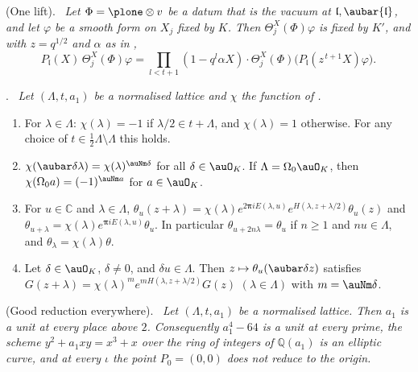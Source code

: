 \documentclass[10pt]{amsart}
\theoremstyle{definition}
\theoremstyle{remark}
\newcommand{\C}{\mathbb C}
\newcommand{\Q}{\mathbb Q}
\newenvironment{quotedthm}[2]{\par\medskip\noindent\begingroup
  \textbf{#1}#2.\ \itshape\ignorespaces}{\endgroup\par\medskip}
\begin{document}
\begin{quotedthm}{\cite[Proposition~6.9]{P49}}{ (One lift)}
Let $\Phi=\plone\otimes v$ be a datum that is the vacuum at $\mathfrak l,\aubar{\mathfrak l}$, and
let $\varphi$ be a smooth form on $X_j$ fixed by $K$. Then $\Theta^X_j(\Phi)\varphi$ is fixed by
$K'$, and with $z=q^{1/2}$ and $\alpha$ as in {\cite[Lemma~6.8]{P49}},
\[
P_{\mathfrak l}(X)\,\Theta^X_j(\Phi)\varphi=\prod_{l<t+1}(1-q^l\alpha X)\cdot\Theta^X_j(\Phi)\bigl(
P_{\mathfrak l}(z^{\,t+1}X)\varphi\bigr).
\]
\end{quotedthm}

\begin{quotedthm}{\cite[Lemma~7.1]{P49}}{}
Let $(\Lambda,t,a_1)$ be a normalised lattice and $\chi$ the function of {\cite[(27)]{P49}}.
\begin{enumerate}
\item[(a)] For $\lambda\in\Lambda$: $\chi(\lambda)=-1$ if $\lambda/2\in t+\Lambda$, and
$\chi(\lambda)=1$ otherwise. For any choice of $t\in\frac12\Lambda\setminus\Lambda$ this holds.
\item[(b)] $\chi(\aubar\delta\lambda)=\chi(\lambda)^{\auNm\delta}$ for all $\delta\in\auO_K$. If
$\Lambda=\Omega_0\auO_K$, then $\chi(\Omega_0a)=(-1)^{\auNm a}$ for $a\in\auO_K$.
\item[(c)] For $u\in\C$ and $\lambda\in\Lambda$, $\theta_u(z+\lambda)=\chi(\lambda)e^{2\boldsymbol
\pi iE(\lambda,u)}e^{H(\lambda,z+\lambda/2)}\theta_u(z)$ and $\theta_{u+\lambda}=\chi(\lambda)
e^{\boldsymbol\pi iE(\lambda,u)}\theta_u$. In particular $\theta_{u+2n\lambda}=\theta_u$ if
$n\ge1$ and $nu\in\Lambda$, and $\theta_\lambda=\chi(\lambda)\theta$.
\item[(d)] Let $\delta\in\auO_K$, $\delta\ne0$, and $\delta u\in\Lambda$. Then $z\mapsto\theta_u
(\aubar\delta z)$ satisfies $G(z+\lambda)=\chi(\lambda)^{m}e^{mH(\lambda,z+\lambda/2)}G(z)$
$(\lambda\in\Lambda)$ with $m=\auNm\delta$.
\end{enumerate}
\end{quotedthm}

\begin{quotedthm}{\cite[Lemma~7.2]{P49}}{ (Good reduction everywhere)}
Let $(\Lambda,t,a_1)$ be a normalised lattice. Then $a_1$ is a unit at every place above $2$.
Consequently $a_1^4-64$ is a unit at every prime, the scheme $y^2+a_1xy=x^3+x$ over the ring of
integers of $\Q(a_1)$ is an elliptic curve, and at every $\iota$ the point $P_0=(0,0)$ does not
reduce to the origin.
\end{quotedthm}
\end{document}
